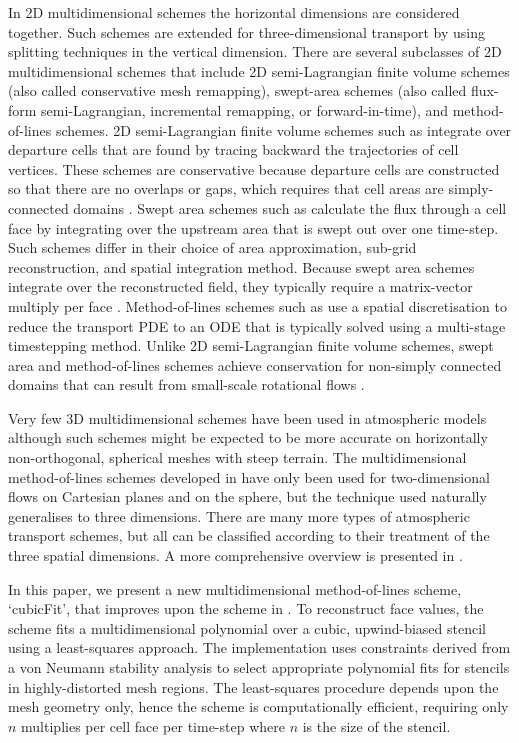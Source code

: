 In 2D multidimensional schemes the horizontal dimensions are considered together.  Such schemes are extended for three-dimensional transport by using splitting techniques in the vertical dimension.
There are several subclasses of 2D multidimensional schemes that include
2D semi-Lagrangian finite volume schemes (also called conservative mesh remapping),
swept-area schemes (also called flux-form semi-Lagrangian, incremental remapping, or forward-in-time),
and method-of-lines schemes.
2D semi-Lagrangian finite volume schemes such as \citep{iske-kaeser2004,lauritzen2010} integrate over departure cells that are found by tracing backward the trajectories of cell vertices.  These schemes are conservative because departure cells are constructed so that there are no overlaps or gaps, which requires that cell areas are simply-connected domains \citep{lauritzen2011book}.
Swept area schemes such as \citep{lashley2002,skamarock-menchaca2010,lauritzen2011,thuburn2014} calculate the flux through a cell face by integrating over the upstream area that is swept out over one time-step.  Such schemes differ in their choice of area approximation, sub-grid reconstruction, and spatial integration method.
Because swept area schemes integrate over the reconstructed field, they typically require a matrix-vector multiply per face \citep{thuburn2014,skamarock-menchaca2010}.
Method-of-lines schemes such as \citep{weller2009,skamarock-gassmann2011} use a spatial discretisation to reduce the transport PDE to an ODE that is typically solved using a multi-stage timestepping method.  
Unlike 2D semi-Lagrangian finite volume schemes, swept area and method-of-lines schemes achieve conservation for non-simply connected domains that can result from small-scale rotational flows \citep{lauritzen2011}.

Very few 3D multidimensional schemes have been used in atmospheric models \citep[e.g.][]{gassmann2013} although such schemes might be expected to be more accurate on horizontally non-orthogonal, spherical meshes with steep terrain.
The multidimensional method-of-lines schemes developed in \citep{weller2009,weller-shahrokhi2014} have only been used for two-dimensional flows on Cartesian planes and on the sphere, but the technique used naturally generalises to three dimensions.
There are many more types of atmospheric transport schemes, but all can be classified according to their treatment of the three spatial dimensions.  A more comprehensive overview is presented in \cite{lauritzen2014}.

In this paper, we present a new multidimensional method-of-lines scheme, `cubicFit', that improves upon the scheme in \citep{weller-shahrokhi2014}.  To reconstruct face values, the scheme fits a multidimensional polynomial over a cubic, upwind-biased stencil using a least-squares approach.  The implementation uses constraints derived from a von Neumann stability analysis to select appropriate polynomial fits for stencils in highly-distorted mesh regions.  The least-squares procedure depends upon the mesh geometry only, hence the scheme is computationally efficient, requiring only $n$ multiplies per cell face per time-step where $n$ is the size of the stencil.


